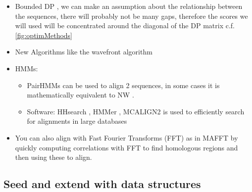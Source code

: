 \documentclass[
  11pt,
  twoside]{scrbook}
\begin{document}
\begin{itemize}
\item
  Bounded DP \autocite{spougeSpeedingDynamicProgramming1989a,fickettFastOptimalAlignment1984}, we can make an assumption about the relationship between the sequences, there will probably not be many gaps, therefore the scores we will used will be concentrated around the diagonal of the DP matrix c.f. \ref{fig:optimMethods}
\item
  New Algorithms like the wavefront algorithm \autocite{marco-solaFastGapaffinePairwise2020}
\item
  HMMs:

  \begin{itemize}
  \item
    PairHMMs can be used to align 2 sequences, in some cases it is mathematically equivalent to NW \autocite{durbinBiologicalSequenceAnalysis1998}.
  \item
    Software: HHsearch \autocite{sodingProteinHomologyDetection2005}, HMMer \autocite{finnHMMERWebServer2011}, MCALIGN2 \autocite{wangMCALIGN2FasterAccurate2006} is used to efficiently search for alignments in large databases
  \end{itemize}
\item
  You can also align with Fast Fourier Transforms (FFT) as in MAFFT \autocite{katohMAFFTNovelMethod2002} by quickly computing correlations with FFT to find homologous regions and then using these to align.
\end{itemize}

\hypertarget{seed-and-extend-with-data-structures}{%
\subsection{Seed and extend with data structures}\label{seed-and-extend-with-data-structures}}
\end{document}
